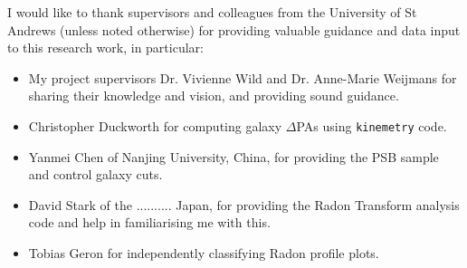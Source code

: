 
I would like to thank supervisors and colleagues from the University of St Andrews (unless noted otherwise) for providing valuable guidance and data input to this research work, in particular:
\begin{itemize}
    \item My project supervisors Dr. Vivienne Wild and Dr. Anne-Marie Weijmans for sharing their knowledge and vision, and providing sound guidance. 
    \item Christopher Duckworth for computing galaxy $\Delta$PAs using \texttt{kinemetry} code.
    \item Yanmei Chen of Nanjing University, China, for providing the PSB sample and control galaxy cuts.
    \item David Stark of the .......... Japan, for providing the Radon Transform analysis code and help in familiarising me with this.
    \item Tobias Geron for independently classifying Radon profile plots.
\end{itemize}
